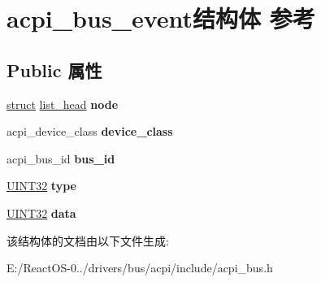 \hypertarget{structacpi__bus__event}{}\section{acpi\+\_\+bus\+\_\+event结构体 参考}
\label{structacpi__bus__event}
\subsection*{Public 属性}
\begin{DoxyCompactItemize}
\item 
\mbox{\label{structacpi__bus__event_af5986fa535c3e3c010733c90a5f82f8e}} 
\hyperlink{interfacestruct}{struct} \hyperlink{structlist__head}{list\+\_\+head} {\bfseries node}
\item 
\mbox{\label{structacpi__bus__event_abc53697c584ef6c39cdca19c03b1142e}} 
acpi\+\_\+device\+\_\+class {\bfseries device\+\_\+class}
\item 
\mbox{\label{structacpi__bus__event_ada264daf05682166f85b2535222c6c77}} 
acpi\+\_\+bus\+\_\+id {\bfseries bus\+\_\+id}
\item 
\mbox{\label{structacpi__bus__event_a3b6b4ac01812a7e8ba8903c77e065c11}} 
\hyperlink{_processor_bind_8h_ae1e6edbbc26d6fbc71a90190d0266018}{U\+I\+N\+T32} {\bfseries type}
\item 
\mbox{\label{structacpi__bus__event_a4f45a141fc47a08bd8edbfc67d166fc4}} 
\hyperlink{_processor_bind_8h_ae1e6edbbc26d6fbc71a90190d0266018}{U\+I\+N\+T32} {\bfseries data}
\end{DoxyCompactItemize}


该结构体的文档由以下文件生成\+:\begin{DoxyCompactItemize}
\item 
E\+:/\+React\+O\+S-\/0../drivers/bus/acpi/include/acpi\+\_\+bus.\+h\end{DoxyCompactItemize}
